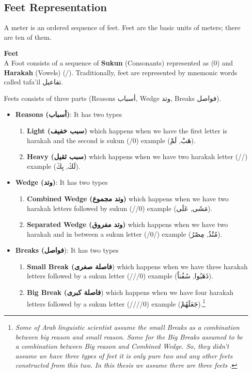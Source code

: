     \newpage
    
    \subsection{Feet Representation}
    A meter is an ordered sequence of feet. Feet are the basic
units of meters; there are ten of them.
\begin{definition}\label{def:feet}
  \textbf{Feet} \hfill \\  A Foot consists of
a sequence of \textbf{Sukun} (Consonants) represented as (0) and \textbf{Harakah} (Vowels) (/). Traditionally, feet are represented by mnemonic words called tafa’il \textarabic{تفاعيل}.
\end{definition}

Feets consists of three parts (Reasons \textarabic{أسباب}, Wedge \textarabic{وتد}, Breaks \textarabic{فواصل}).
\begin{itemize}
\item \textbf{Reasons (\textarabic{أسباب})}: It has two types
  \begin{enumerate}
  \item \textbf{Light (\textarabic{سبب خفيف})} which happens when we have the first letter is harakah and the second is sukun (/0) example (\textarabic{هَبْ, لَمْ}).
    \item \textbf{Heavy (\textarabic{سبب ثقيل})} which happens when we have two harakah letter (//) example (\textarabic{لَكَ, بِكَ}).
    \end{enumerate}
    \item \textbf{Wedge (\textarabic{وتد})}: It has two types
  \begin{enumerate}
  \item \textbf{Combined Wedge (\textarabic{وتد مجموع})} which happens when we have two harakah letters followed by sukun (//0) example (\textarabic{مَشَى, عَلَى}).
    \item \textbf{Separated Wedge (\textarabic{وتد مفروق})} which happens when we have two harakah and in between a sukun letter (/0/) example (\textarabic{مُنْذُ, مِصْرُ}).
    \end{enumerate}
    \item \textbf{Breaks (\textarabic{فواصل}}): It has two types
  \begin{enumerate}
  \item \textbf{Small Break (\textarabic{فاصلة صغرى}}) which happens when we have three harakah letters followed by a sukun letter (///0) example (\textarabic{ذَهَبُوا, سُفُناً}).
    \item \textbf{Big Break (\textarabic{فاصلة كبرى}}) which happens when we have four harakah letters followed by a sukun letter  (////0) example (\textarabic{جَعَلَهُمْ}).\footnote{\textit{Some of Arab linguistic scientist assume the small Breaks as a combination between big reason and small reason. Same for the Big Breaks assumed to be a combination between Big reason and Combined Wedge. So, they didn't assume we have three types of feet it is only pure two and any other feets constructed from this two. In this thesis we assume there are three feets }.}
    \end{enumerate}
  \end{itemize}

